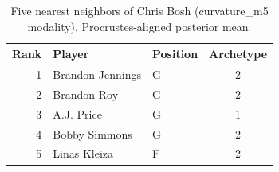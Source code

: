 \begin{table}[htbp]
  \centering\small
  \begin{tabular}{rllc}
    \toprule
    Rank & Player & Position & Archetype \\
    \midrule
    1 & Brandon Jennings & G & 2 \\
    2 & Brandon Roy & G & 2 \\
    3 & A.J. Price & G & 1 \\
    4 & Bobby Simmons & G & 2 \\
    5 & Linas Kleiza & F & 2 \\
    \bottomrule
  \end{tabular}
  \caption{Five nearest neighbors of Chris Bosh (curvature_m5 modality), Procrustes-aligned posterior mean.}
  \label{tab:Chris_Bosh_neighbors_curvature_m5}
\end{table}

